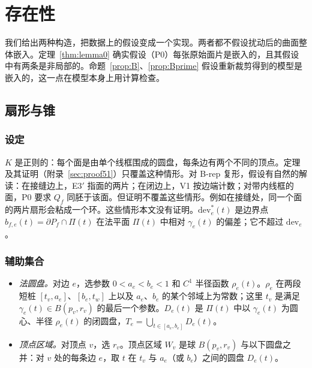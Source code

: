 \section{存在性}\label{sec:existence}

我们给出两种构造，把数据上的假设变成一个实现。两者都不假设扰动后的曲面整体嵌入。定理~\ref{thm:lemma0} 确实假设（P0）每张原始面片是嵌入的，且其假设中有两条是非局部的。命题~\ref{prop:B}、\ref{prop:Bprime} 假设重新裁剪得到的模型是嵌入的，这一点在模型本身上用计算检查。

\subsection{扇形与锥}\label{sec:fans}

\subsubsection*{设定}
$K$ 是正则的：每个面是由单个线框围成的圆盘，每条边有两个不同的顶点。定理及其证明（附录~\ref{sec:proof51}）只覆盖这种情形。对 B-rep 复形，假设有自然的解读：在接缝边上，E3$'$ 指面的两片；在闭边上，V1 按边端计数；对带内线框的面，P0 要求 $Q_f$ 同胚于该面。但证明不覆盖这些情形。例如在接缝处，同一个面的两片扇形会粘成一个环。这些情形本文没有证明。$\mathrm{dev}^*_e(t)$ 是边界点 $b_{f,e}(t)=\partial P_f\cap\Pi(t)$ 在法平面 $\Pi(t)$ 中相对 $\gamma_e(t)$ 的偏差；它不超过 $\mathrm{dev}_e$。

\subsubsection*{辅助集合}
\begin{itemize}
\item \emph{法圆盘。}对边 $e$，选参数 $0<a_e<b_e<1$ 和 $C^1$ 半径函数 $\rho_e(t)$。$\rho_e$ 在两段短桩 $[t_v,a_e]$、$[b_e,t_w]$ 上以及 $a_e$、$b_e$ 的某个邻域上为常数；这里 $t_v$ 是满足 $\gamma_e(t)\in B(p_v,r_v)$ 的最后一个参数。$D_e(t)$ 是 $\Pi(t)$ 中以 $\gamma_e(t)$ 为圆心、半径 $\rho_e(t)$ 的闭圆盘，$T_e=\bigcup_{t\in[a_e,b_e]}D_e(t)$。
\item \emph{顶点区域。}对顶点 $v$，选 $r_v$。顶点区域 $W_v$ 是球 $B(p_v,r_v)$ 与以下圆盘之并：对 $v$ 处的每条边 $e$，取 $t$ 在 $t_v$ 与 $a_e$（或 $b_e$）之间的圆盘 $D_e(t)$。
\end{itemize}

